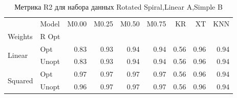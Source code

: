 \begin{table}
\caption{Метрика R2 для набора данных Rotated Spiral,Linear A,Simple B}
\label{tab:R2_Rotated Spiral,Linear A,Simple B}
\begin{tabular}{llrrrrrrr}
\toprule
 & Model & M0.00 & M0.25 & M0.50 & M0.75 & KR & XT & KNN \\
Weights & R Opt &  &  &  &  &  &  &  \\
\midrule
\multirow[t]{2}{*}{Linear} & Opt & 0.83 & 0.93 & 0.94 & 0.94 & 0.56 & 0.96 & 0.94 \\
 & Unopt & 0.83 & 0.93 & 0.94 & 0.94 & 0.56 & 0.96 & 0.94 \\

\multirow[t]{2}{*}{Squared} & Opt & 0.97 & 0.97 & 0.97 & 0.97 & 0.56 & 0.96 & 0.94 \\
 & Unopt & 0.96 & 0.97 & 0.97 & 0.97 & 0.56 & 0.96 & 0.94 \\

\bottomrule
\end{tabular}
\end{table}
